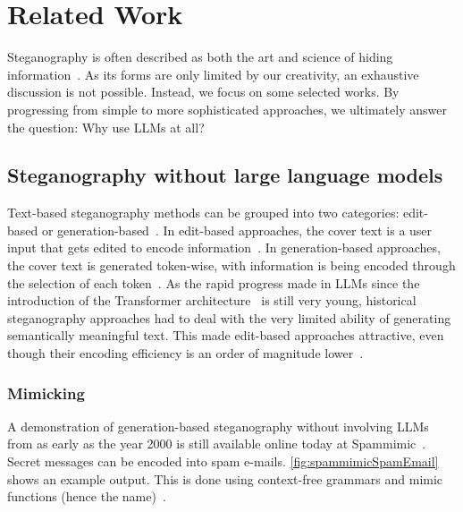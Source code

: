 
\chapter{Related Work}\label{ch:relatedwork}
\glsresetall %

Steganography is often described as both the art and science of hiding information~\cite{bennettLinguisticSteganographySurvey2004}. As its forms are only limited by our creativity, an exhaustive discussion is not possible. Instead, we focus on some selected works. By progressing from simple to more sophisticated approaches, we ultimately answer the question: Why use \glspl{LLM} at all?

\section{Steganography without large language models}
\label{sec:steganographyWithoutLLMs}
Text-based steganography methods can be grouped into two categories: edit-based or generation-based~\cite{zieglerNeuralLinguisticSteganography2019,bennettLinguisticSteganographySurvey2004}. In edit-based approaches, the cover text is a user input that gets edited to encode information~\cite{zieglerNeuralLinguisticSteganography2019}. In generation-based approaches, the cover text is generated token-wise, with information is being encoded through the selection of each token~\cite{zieglerNeuralLinguisticSteganography2019}. As the rapid progress made in \glspl{LLM} since the introduction of the Transformer architecture~\cite{vaswaniAttentionAllYou2023} is still very young, historical steganography approaches had to deal with the very limited ability of generating semantically meaningful text. This made edit-based approaches attractive, even though their encoding efficiency is an order of magnitude lower~\cite{zieglerNeuralLinguisticSteganography2019}.

\subsection{Mimicking}
\label{sec:mimicking}
A demonstration of generation-based steganography without involving \glspl{LLM} from as early as the year 2000 is still available online today at Spammimic~\cite{spammimicSpammimic2000,dembartEndUserHide2001,bennettLinguisticSteganographySurvey2004}. Secret messages can be encoded into spam e-mails. \cref{fig:spammimicSpamEmail} shows an example output. This is done using context-free grammars and mimic functions (hence the name)~\cite{waynerMimicFunctions1992,bennettLinguisticSteganographySurvey2004}.

